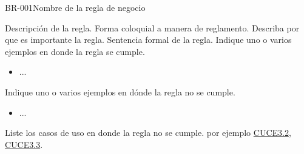 



\begin{BussinesRule}[%
	\brClassification{\btEnabler}{\bcCondition}{\blStrict}
	]{BR-001}{Nombre de la regla de negocio}
	
	\BRitem[Descripción:] Descripción de la regla. Forma coloquial a manera de reglamento.
	\BRitem[Motivación:] Describa por que es importante la regla.
	\BRitem[Sentencia:] Sentencia formal de la regla.
	 Indique uno o varios ejemplos en donde la regla se cumple.
        \begin{itemize}
        	\item ...
        \end{itemize}
	
	 Indique uno o varios ejemplos en dónde la regla no se cumple.
		\begin{itemize}
        	\item ...
        \end{itemize}
	
	 Liste los casos de uso en donde la regla no se cumple. por ejemplo \hyperlink{CUCE3.2}{CUCE3.2}, \hyperlink{CUCE3.3}{CUCE3.3}.
\end{BussinesRule}



